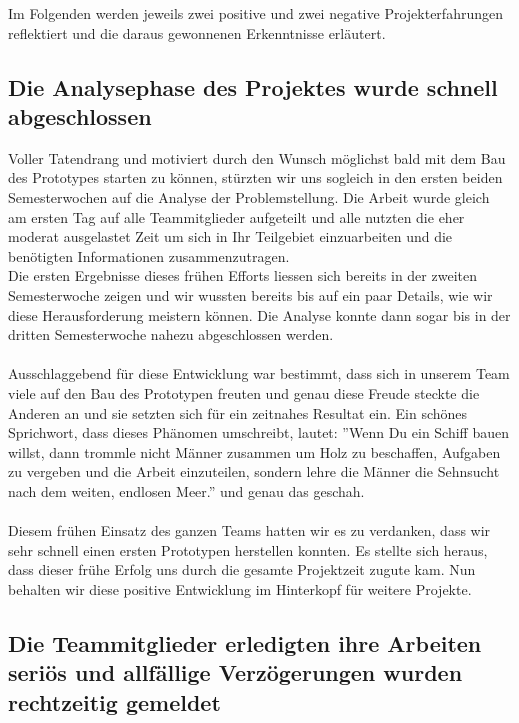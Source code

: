 Im  Folgenden werden jeweils zwei positive und zwei negative Projekterfahrungen reflektiert und die daraus gewonnenen Erkenntnisse erläutert.

\subsection{Die Analysephase des Projektes wurde schnell abgeschlossen}

Voller Tatendrang und motiviert durch den Wunsch möglichst bald mit dem Bau des Prototypes starten zu können, stürzten wir uns sogleich in den ersten beiden Semesterwochen auf die Analyse der Problemstellung. Die Arbeit wurde gleich am ersten Tag auf alle Teammitglieder aufgeteilt und alle nutzten die eher moderat ausgelastet Zeit um sich in Ihr Teilgebiet einzuarbeiten und die benötigten Informationen zusammenzutragen.\\
Die ersten Ergebnisse dieses frühen Efforts liessen sich bereits in der zweiten Semesterwoche zeigen und wir wussten bereits bis auf ein paar Details, wie wir diese Herausforderung meistern können. Die Analyse konnte dann sogar bis in der dritten Semesterwoche nahezu abgeschlossen werden.\\
\\
Ausschlaggebend für diese Entwicklung war bestimmt, dass sich in unserem Team viele auf den Bau des Prototypen freuten und genau diese Freude steckte die Anderen an und sie setzten sich für ein zeitnahes Resultat ein. Ein schönes Sprichwort, dass dieses Phänomen umschreibt, lautet:  ''Wenn Du ein Schiff bauen willst, dann trommle nicht Männer zusammen um Holz zu beschaffen, Aufgaben zu vergeben und die Arbeit einzuteilen, sondern lehre die Männer die Sehnsucht nach dem weiten, endlosen Meer.'' \cite{SCHIFF} und genau das geschah.\\
\\
Diesem frühen Einsatz des ganzen Teams hatten wir es zu verdanken, dass wir sehr schnell einen ersten Prototypen herstellen konnten. Es stellte sich heraus, dass dieser frühe Erfolg uns durch die gesamte Projektzeit zugute kam. Nun behalten wir diese positive Entwicklung im Hinterkopf für weitere Projekte.

\subsection{Die Teammitglieder erledigten ihre Arbeiten seriös und allfällige Verzögerungen wurden rechtzeitig gemeldet}

